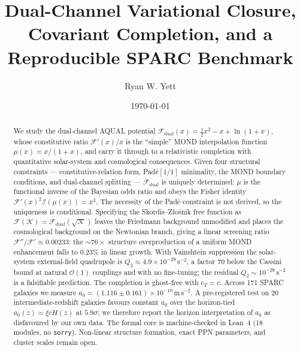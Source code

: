 \documentclass[aps,prd,preprint,superscriptaddress,nofootinbib,amsmath,amssymb,floatfix]{revtex4-2}
\begin{document}
\title{Dual-Channel Variational Closure, Covariant Completion, and a Reproducible SPARC Benchmark}

\author{Ryan W. Yett}

\date{\today}

\begin{abstract}
We study the dual-channel AQUAL potential $\mathcal{F}_{\text{dual}}(x) = \tfrac{1}{2}x^2 - x + \ln(1+x)$, whose constitutive ratio $\mathcal{F}'(x)/x$ is the ``simple'' MOND interpolation function $\mu(x) = x/(1+x)$, and carry it through to a relativistic completion with quantitative solar-system and cosmological consequences. Given four structural constraints --- constitutive-relation form, Pad\'e$[1/1]$ minimality, the MOND boundary conditions, and dual-channel splitting --- $\mathcal{F}_{\text{dual}}$ is uniquely determined; $\mu$ is the functional inverse of the Bayesian odds ratio and obeys the Fisher identity $\mathcal{F}'(x)^2\mathcal{I}(\mu(x)) = x^3$. The necessity of the Pad\'e constraint is not derived, so the uniqueness is conditional. Specifying the Skordis--Z\l{}o\'snik free function as $\mathcal{F}(\mathcal{K}) = \mathcal{F}_{\text{dual}}(\sqrt{\mathcal{K}})$ leaves the Friedmann background unmodified and places the cosmological background on the Newtonian branch, giving a linear screening ratio $\mathcal{F}''/\mathcal{F}' \approx 0.00233$: the $\sim 76\times$ structure overproduction of a uniform MOND enhancement falls to $0.23\%$ in linear growth. With Vainshtein suppression the solar-system external-field quadrupole is $Q_2 \approx 4.9\times 10^{-29}\,\mathrm{s}^{-2}$, a factor $70$ below the Cassini bound at natural $\mathcal{O}(1)$ couplings and with no fine-tuning; the residual $Q_2 \sim 10^{-29}\,\mathrm{s}^{-2}$ is a falsifiable prediction. The completion is ghost-free with $c_T = c$. Across 171 SPARC galaxies we measure $a_0 = (1.116 \pm 0.161)\times 10^{-10}\,\mathrm{m\,s^{-2}}$. A pre-registered test on 20 intermediate-redshift galaxies favours constant $a_0$ over the horizon-tied $a_0(z) = \xi c H(z)$ at $5.9\sigma$; we therefore report the horizon interpretation of $a_0$ as disfavoured by our own data. The formal core is machine-checked in Lean~4 (18 modules, no \texttt{sorry}). Non-linear structure formation, exact PPN parameters, and cluster scales remain open.
\end{abstract}

\end{document}
